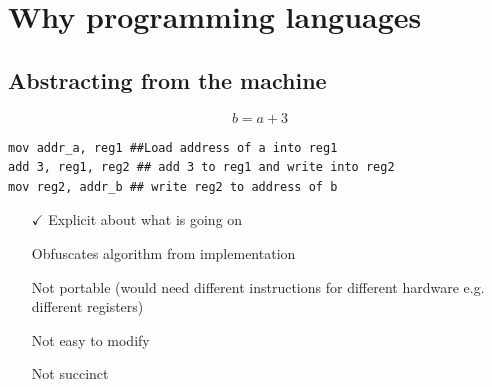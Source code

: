 \documentclass{article}[18pt]
\newcommand{\xmark}{\ding{55}}%
\begin{document}
\section{Why programming languages}
\subsection{Abstracting from the machine}
$$b=a+3$$
\begin{verbatim}
mov addr_a, reg1 ##Load address of a into reg1
add 3, reg1, reg2 ## add 3 to reg1 and write into reg2 
mov reg2, addr_b ## write reg2 to address of b
\end{verbatim}
\begin{itemize}
	\item [$\checkmark$] Explicit about what is going on
	\item [\xmark] Obfuscates algorithm from implementation
	\item [\xmark] Not portable (would need different instructions for different hardware e.g. different registers)
	\item [\xmark] Not easy to modify
	\item [\xmark] Not succinct
\end{itemize}
\end{document}
